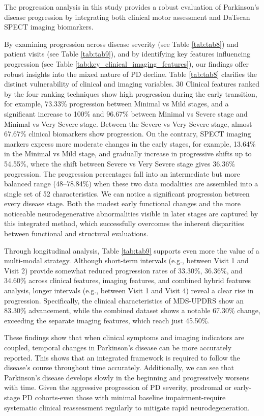 \documentclass{article}
\begin{document}
The progression analysis in this study provides a robust evaluation of Parkinson's disease progression by integrating both clinical motor assessment and DaTscan SPECT imaging biomarkers.

By examining progression across disease severity (see Table \ref{tab:tab8}) and patient visits (see Table \ref{tab:tab9}), and by identifying key features influencing progression (see Table \ref{tab:key_clinical_imaging_features}), our findings offer robust insights into the mixed nature of PD decline.
Table \ref{tab:tab8} clarifies the distinct vulnerability of clinical and imaging variables. 30 Clinical features ranked by the four ranking techniques show high progression during the early transition, for example, 73.33\% progression between Minimal vs Mild stages, and a significant increase to 100\% and 96.67\% between Minimal vs Severe stage and Minimal vs Very Severe stage. Between the Severe vs Very Severe stage, almost 67.67\% clinical biomarkers show progression. On the contrary, SPECT imaging markers express more moderate changes in the early stages, for example, 13.64\% in the Minimal vs Mild stage, and gradually increase in progressive shifts up to 54.55\%, where the shift between Severe vs Very Severe stage gives 36.36\% progression. The progression percentages fall into an intermediate but more balanced range (48–78.84\%) when these two data modalities are assembled into a single set of 52 characteristics. We can notice a significant progression between every disease stage. Both the modest early functional changes and the more noticeable neurodegenerative abnormalities visible in later stages are captured by this integrated method, which successfully overcomes the inherent disparities between functional and structural evaluations.

Through longitudinal analysis, Table \ref{tab:tab9} supports even more the value of a multi-modal strategy. Although short-term intervals (e.g., between Visit 1 and Visit 2) provide somewhat reduced progression rates of 33.30\%, 36.36\%, and 34.60\% across clinical features, imaging features, and combined hybrid features analysis, longer intervals (e.g., between Visit 1 and Visit 4) reveal a clear rise in progression. Specifically, the clinical characteristics of MDS-UPDRS show an 83.30\% advancement, while the combined dataset shows a notable 67.30\% change, exceeding the separate imaging features, which reach just 45.50\%. 

These findings show that when clinical symptoms and imaging indicators are coupled, temporal changes in Parkinson's disease can be more accurately reported. This shows that an integrated framework is required to follow the disease's course throughout time accurately. Additionally, we can see that Parkinson's disease develops slowly in the beginning and progressively worsens with time. Given the aggressive progression of PD severity, prodromal or early-stage PD cohorts-even those with minimal baseline impairment-require systematic clinical reassessment regularly to mitigate rapid neurodegeneration.
\end{document}
